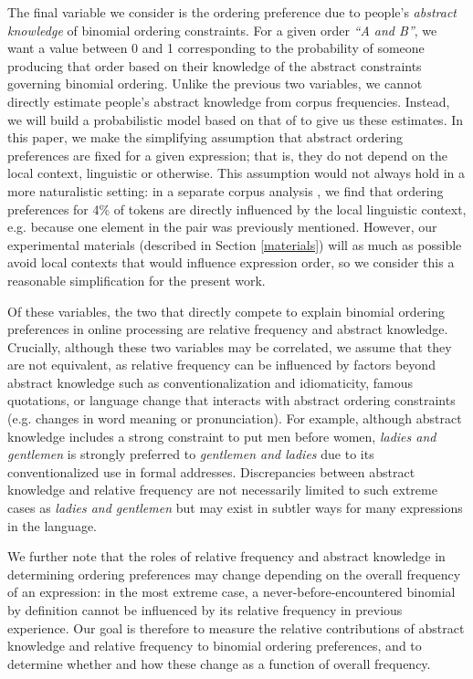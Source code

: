 \documentclass[authoryear]{elsarticle}
\begin{document}
The final variable we consider is the ordering preference due to people's \emph{abstract knowledge} of binomial ordering constraints. For a given order \emph{``A and B''}, we want a value between 0 and 1 corresponding to the probability of someone producing that order based on their knowledge of the abstract constraints governing binomial ordering. Unlike the previous two variables, we cannot directly estimate people's abstract knowledge from corpus frequencies. Instead, we will build a probabilistic model based on that of \citet{Benor:2006gv} to give us these estimates. In this paper, we make the simplifying assumption that abstract ordering preferences are fixed for a given expression; that is, they do not depend on the local context, linguistic or otherwise. This assumption would not always hold in a more naturalistic setting: in a separate corpus analysis \citep[][chapter 3]{Morgan:2016ud}, we find that ordering preferences for 4\% of tokens are directly influenced by the local linguistic context, e.g. because one element in the pair was previously mentioned. However, our experimental materials (described in Section \ref{materials}) will as much as possible avoid local contexts that would influence expression order, so we consider this a reasonable simplification for the present work.

Of these variables, the two that directly compete to explain binomial ordering preferences in online processing are relative frequency and abstract knowledge. Crucially, although these two variables may be correlated, we assume that they are not equivalent, as relative frequency can be influenced by factors beyond abstract knowledge such as conventionalization and idiomaticity, famous quotations, or language change that interacts with abstract ordering constraints (e.g. changes in word meaning or pronunciation). For example, although abstract knowledge includes a strong constraint to put men before women, \emph{ladies and gentlemen} is strongly preferred to \emph{gentlemen and ladies} due to its conventionalized use in formal addresses. Discrepancies between abstract knowledge and relative frequency are not necessarily limited to such extreme cases as \emph{ladies and gentlemen} but may exist in subtler ways for many expressions in the language.

We further note that the roles of relative frequency and abstract knowledge in determining ordering preferences may change depending on the overall frequency of an expression: in the most extreme case, a never-before-encountered binomial by definition cannot be influenced by its relative frequency in previous experience. Our goal is therefore to measure the relative contributions of abstract knowledge and relative frequency to binomial ordering preferences, and to determine whether and how these change as a function of overall frequency.
\end{document}
